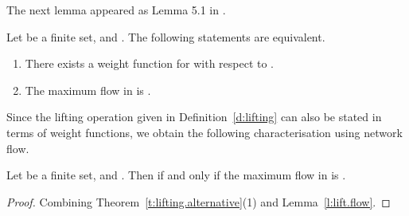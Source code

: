 \documentclass{article}
\newcommand{\temporaryremove}[1]{}
\def\squareforqed{\hbox{\rlap{}}}
\def\qed{\ifmmode\squareforqed\else{\unskip\nobreak\hfil
\penalty50\hskip1em\null\nobreak\hfil\squareforqed
\parfillskip=0pt\finalhyphendemerits=0\endgraf}\fi}
\begin{document}
\temporaryremove{ \begin{figure}
\psset{unit=0.8cm}
\begin{center}
\rput(-5.5,-1){\rnode{source}{\qdisk(0,0){2pt}}}
\rput(5.5,-1){\rnode{sink}{\qdisk(0,0){2pt}}}
\uput[l](-5.5,-1){} \uput[r](5.5,-1){}
\rput(-2.5,1){\rnode{s1}{\qdisk(0,0){2pt}}} \uput[l](-2.5,1){}
\rput(-2.5,-0.5){\rnode{s2}{\qdisk(0,0){2pt}}}
\uput[l](-2.5,-0.25){} \rput(-2.5,-2){}
\rput(-2.5,-3.5){\rnode{sn}{\qdisk(0,0){2pt}}}
\uput[l](-2.5,-3.5){}
\rput(2.5,1){\rnode{t1}{\qdisk(0,0){2pt}}} \uput[r](2.5,1){}
\rput(2.5,-0.5){\rnode{t2}{\qdisk(0,0){2pt}}}
\uput[r](2.5,-0.25){} \rput(2.5,-2){}
\uput[r](2.5,-3.5){}
\rput(2.5,-3.5){\rnode{tn}{\qdisk(0,0){2pt}}}
\ncline[nodesep=2mm]{->}{s1}{t1}\aput{:U}{}
\ncline[nodesep=2mm]{->}{s1}{t2}\aput{:U}{}
\ncline[nodesep=2mm]{->}{s1}{tn}\aput{:U}{}
\ncline[nodesep=2mm]{->}{s2}{t2}\aput{:U}{}
\ncline[nodesep=2mm]{->}{s2}{tn}\bput{:U}{}
\ncline[nodesep=2mm]{->}{sn}{tn}\bput{:U}{}
\ncline[nodesep=2mm]{->}{source}{s1}\aput{:U}{}
\ncline[nodesep=2mm]{->}{source}{s2}\bput{:U}{}
\ncline[nodesep=2mm]{->}{source}{sn}\bput{:U}{}
\ncline[nodesep=2mm]{->}{t1}{sink}\aput{:U}{}
\ncline[nodesep=2mm]{->}{t2}{sink}\bput{:U}{}
\ncline[nodesep=2mm]{->}{tn}{sink}\bput{:U}{}
\uput[d](0,-4.5){ for all }
\end{center}\vskip 4cm
\caption{The network }\label{f:network}
\end{figure}
}
The next lemma appeared as Lemma 5.1 in \cite{BEM00}.
\begin{lemma}\label{l:lift.flow}
Let  be a finite set,  and
. The following statements are equivalent.
\begin{enumerate}
\item There exists a weight function  for  with
  respect to .
\item The maximum flow in  is .
\hfill\qed
\end{enumerate}
\end{lemma}

Since the lifting operation given in Definition~\ref{d:lifting} can
also be stated in terms of weight functions, we obtain the following
characterisation using network flow.
\begin{theorem}\label{t:lift.flow}
Let  be a finite set,  and
. Then  if and
only if the maximum flow in
   is .
\end{theorem}
\begin{proof}
Combining Theorem~\ref{t:lifting.alternative}(1) and
Lemma~\ref{l:lift.flow}.
\end{proof}
\end{document}
